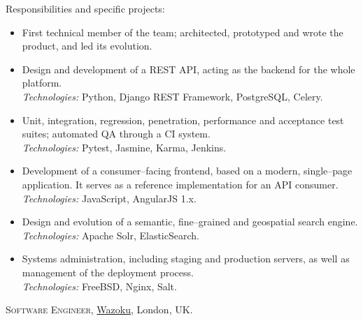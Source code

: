 \documentclass[11pt]{article}
\newcommand{\years}[1]{\marginnote{\scriptsize #1}}
\begin{document}
Responsibilities and specific projects:
\begin{itemize}
	\item  First technical member of the team; architected, prototyped and wrote the product, and led its evolution.
	\item  Design and development of a REST API, acting as the backend for the whole platform.\\
	\textit{Technologies:} Python, Django REST Framework, PostgreSQL, Celery.
	\item  Unit, integration, regression, penetration, performance and acceptance test suites; automated QA through a CI system.\\
	\textit{Technologies:} Pytest, Jasmine, Karma, Jenkins.
	\item  Development of a consumer--facing frontend, based on a modern, single--page application. It serves as a reference implementation for an API consumer.\\
	\textit{Technologies:} JavaScript, AngularJS 1.x.
	\item  Design and evolution of a semantic, fine--grained and geospatial search engine. \\
	\textit{Technologies:} Apache Solr, ElasticSearch.
	\item  Systems administration, including staging and production servers, as well as management of the deployment process.\\
	\textit{Technologies:} FreeBSD, Nginx, Salt.
\end{itemize}

\years{2014}\textsc{Software Engineer}, \href{http://www.wazoku.com}{Wazoku}, London, UK.
\end{document}
